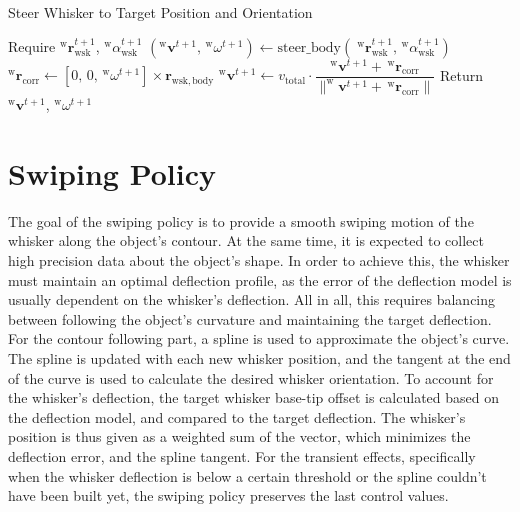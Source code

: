 \begin{algorithm}[htb]
    \caption{Steer Whisker to Target Position and Orientation}
    \begin{algorithmic}
        \State Require \(^{\mathrm{w}}\boldsymbol{r}_{\mathrm{wsk}}^{t+1}\), \(^{\mathrm{w}}\alpha_{\mathrm{wsk}}^{t+1}\)
        \State \((^{\mathrm{w}}\boldsymbol{v}^{t+1},\, ^{\mathrm{w}}\omega^{t+1}) \gets \mathrm{steer\_body}(\;^{\mathrm{w}}\boldsymbol{r}_{\mathrm{wsk}}^{t+1},\, ^{\mathrm{w}}\alpha_{\mathrm{wsk}}^{t+1})\)
        \State \(^{\mathrm{w}}\boldsymbol{r}_{\mathrm{corr}} \gets [0,\,0,\,^{\mathrm{w}}\omega^{t+1}] \times \boldsymbol{r}_{\mathrm{wsk, body}}\) 
        \State \(^{\mathrm{w}}\boldsymbol{v}^{t+1} \gets v_{\mathrm{total}} \cdot \dfrac{^{\mathrm{w}}\boldsymbol{v}^{t+1} + \,^{\mathrm{w}}\boldsymbol{r}_{\mathrm{corr}}}{\|^{\mathrm{w}}\boldsymbol{v}^{t+1} + \,^{\mathrm{w}}\boldsymbol{r}_{\mathrm{corr}}\|}\)
        \State Return \(^{\mathrm{w}}\boldsymbol{v}^{t+1}\), \(^{\mathrm{w}}\omega^{t+1}\)
    \end{algorithmic}
    \label{alg:steer_whisker}
\end{algorithm}


\section{Swiping Policy}

The goal of the swiping policy is to provide a smooth swiping motion of the whisker along the object's contour.
At the same time, it is expected to collect high precision data about the object's shape.
In order to achieve this, the whisker must maintain an optimal deflection profile, as the error of the deflection model is usually dependent on the whisker's deflection.
All in all, this requires balancing between following the object's curvature and maintaining the target deflection.
For the contour following part, a spline is used to approximate the object's curve.
The spline is updated with each new whisker position, and the tangent at the end of the curve is used to calculate the desired whisker orientation.
To account for the whisker's deflection, the target whisker base-tip offset is calculated based on the deflection model, and compared to the target deflection.
The whisker's position is thus given as a weighted sum of the vector, which minimizes the deflection error, and the spline tangent.
For the transient effects, specifically when the whisker deflection is below a certain threshold or the spline couldn't have been built yet, the swiping policy preserves the last control values.

